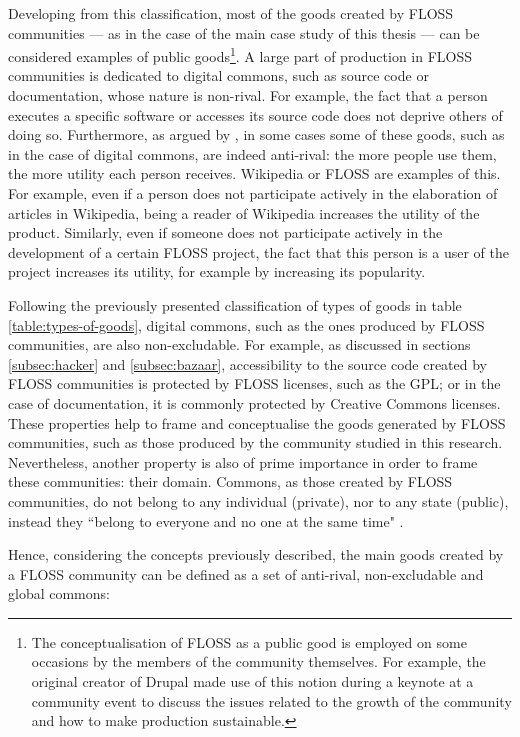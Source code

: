 Developing from this classification, most of the goods created by FLOSS communities --- as in the case of the main case study of this thesis --- can be considered examples of public goods\footnote{The conceptualisation of FLOSS as a public good is employed on some occasions by the members of the community themselves. For example, the original creator of Drupal made use of this notion during a keynote at a community event \parencite{buytaert-oss-scaling:2014:Online,buytaert-oss-keynote-dcon14amsterdam:2014:Online} to discuss the issues related to the growth of the community and how to make production sustainable.}.
A large part of production in FLOSS communities is dedicated to digital commons, such as source code or documentation, whose nature is non-rival. For example, the fact that a person executes a specific software or accesses its source code does not deprive others of doing so. Furthermore, as argued by \textcite{weber2004success}, in some cases some of these goods, such as in the case of digital commons, are indeed anti-rival: the more people use them, the more utility each person receives. Wikipedia or FLOSS are examples of this. For example, even if a person does not participate actively in the elaboration of articles in Wikipedia, being a reader of Wikipedia increases the utility of the product. Similarly, even if someone does not participate actively in the development of a certain FLOSS project, the fact that this person is a user of the project increases its utility, for example by increasing its popularity. 

Following the previously presented classification of types of goods in table \ref{table:types-of-goods}, digital commons, such as the ones produced by FLOSS communities, are also non-excludable. For example, as discussed in sections \ref{subsec:hacker} and \ref{subsec:bazaar},  accessibility to the source code created by FLOSS communities is protected by FLOSS licenses, such as the GPL; or in the case of documentation, it is commonly protected by Creative Commons licenses. These properties help to frame and conceptualise the goods generated by FLOSS communities, such as those produced by the community studied in this research. Nevertheless, another property is also of prime importance in order to frame these communities: their domain. Commons, as those created by FLOSS communities, do not belong to any individual (private), nor to any state (public), instead they ``belong to everyone and no one at the same time" \parencite[1]{lafuente2007cuatro}.

Hence, considering the concepts previously described, the main goods created by a FLOSS community can be defined as a set of anti-rival, non-excludable and global commons:

